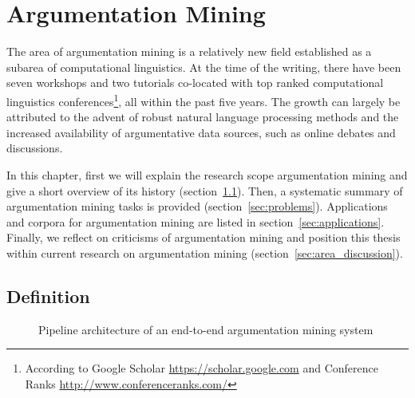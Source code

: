 \chapter{Argumentation Mining}
\label{chap:argmin}

The area of argumentation mining is a relatively new field established as a
subarea of computational linguistics.  At the time of the writing, there have
been seven workshops and two tutorials co-located with top ranked computational
linguistics conferences\footnote{According to Google Scholar
\url{https://scholar.google.com} and Conference Ranks
\url{http://www.conferenceranks.com/}}, all within the past five years. The
growth can largely be attributed to the advent of robust natural language
processing methods and the increased availability of argumentative data sources,
such as online debates and discussions. 

In this chapter, first we will explain the research scope argumentation
mining and give a short overview of its history (section~\ref{sec:definition}).
Then, a systematic summary of argumentation mining tasks is provided
(section~\ref{sec:problems}). Applications and corpora for argumentation mining 
are listed in section~\ref{sec:applications}. 
Finally, we reflect on criticisms of argumentation mining
and position this thesis within current research on argumentation mining
(section~\ref{sec:area_discussion}).

\section{Definition}
\label{sec:definition}

\begin{figure}[t]
	\caption{Pipeline architecture of an end-to-end argumentation mining 
	system}
	\label{fig:pipeline}
\end{figure}


